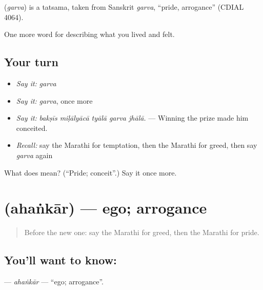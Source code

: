 \begin{cousinweb}
\textbf{} (\emph{garva}) is a tatsama, taken from Sanskrit \emph{garva}, \textquotedblleft{}pride, arrogance\textquotedblright{} (CDIAL 4064).
\end{cousinweb}

\begin{grammarlens}[title={What you've built}]
One more word for describing what you lived and felt.
\end{grammarlens}

\subsection*{Your turn}
\begin{itemize}
\raggedright
  \item \emph{Say it:} \emph{garva}
  \item \emph{Say it:} \emph{garva}, once more
  \item \emph{Say it:} \emph{bakṣīs miḷālyācā tyālā garva jhālā.} — Winning the prize made him conceited.
  \item \emph{Recall:} say the Marathi for temptation, then the Marathi for greed, then say \emph{garva} again
\end{itemize}

\begin{tcolorbox}[breakable,colback=teal!4,colframe=teal!35!black,title={Before you move on}]
What does  mean? (\textquotedblleft{}Pride; conceit\textquotedblright{}.) Say it once more.
\end{tcolorbox}
\section[\texorpdfstring{\mr{अहंकार} (ahaṅkār)}{अहंकार (ahaṅkār)}]{ (ahaṅkār) — ego; arrogance}

\label{lesson:MR-C463-ahankar}



\begin{quote}
Before the new one: say the Marathi for greed, then the Marathi for pride.
\end{quote}

\subsection*{You'll want to know: }
\textbf{} — \emph{ahaṅkār} — \textquotedblleft{}ego; arrogance\textquotedblright{}.


